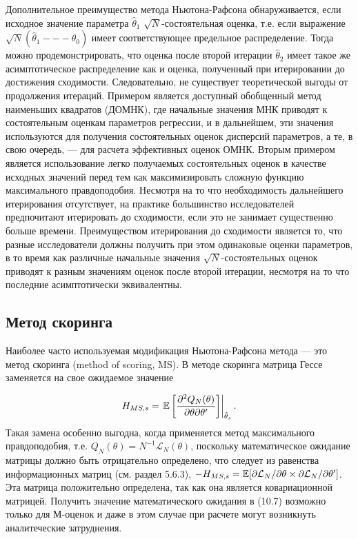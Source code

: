 Дополнительное преимущество метода Ньютона-Рафсона обнаруживается, если исходное значение параметра $\hat{\theta}_1$ $\sqrt{N}$-состоятельная оценка, т.е. если выражение $\sqrt{N}(\hat{\theta}_1 --- \theta_0)$ имеет соответствующее предельное распределение. Тогда можно продемонстрировать, что оценка после второй итерации $\hat{\theta}_2$ имеет такое же асимптотическое распределение как и оценка, полученный при итерировании до достижения сходимости. Следовательно, не существует теоретической выгоды от продолжения итераций. Примером является  доступный обобщенный метод наименьших квадратов (ДОМНК), где начальные значения МНК приводят к состоятельным оценкам параметров регрессии, и в дальнейшем, эти значения используются для получения состоятельных оценок дисперсий параметров, а те, в свою очередь, --- для расчета эффективных оценок ОМНК. Вторым примером является использование легко получаемых состоятельных оценок в качестве исходных значений перед тем как максимизировать сложную функцию максимального правдоподобия. Несмотря на то что необходимость дальнейшего итерирования отсутствует, на практике большинство исследователей предпочитают итерировать до сходимости, если это не занимает существенно больше времени. Преимуществом итерирования до сходимости является то, что разные исследователи должны получить при этом одинаковые оценки параметров, в то время как различные начальные значения $\sqrt{N}$-состоятельных оценок приводят к разным значениям оценок после второй итерации, несмотря на то что последние асимптотически эквивалентны.

\subsection{Метод скоринга}

Наиболее часто используемая модификация Ньютона-Рафсона метода --- это метод скоринга (method of scoring, MS). В методе скоринга матрица Гессе заменяется на свое ожидаемое значение

\begin{equation}
H_{MS,s} =\left. \mathbb{E} \left[\dfrac{\partial^2 Q_N(\theta)}{\partial{\theta}\partial{\theta}'}\right] \right|_{\hat{\theta}_s}. 
\end{equation}
Такая замена особенно выгодна, когда применяется метод максимального правдоподобия, т.е. $Q_N(\theta) = N^{-1}\mathcal{L}_N(\theta)$, поскольку математическое ожидание  матрицы должно быть отрицательно определено, что следует из равенства информационных матриц (см. раздел 5.6.3), $-H_{MS,s} = \mathbb{E} [\partial{\mathcal{L}_N}/\partial{\theta} \times \partial{\mathcal{L}_N}/\partial{\theta}']$. %
Эта матрица положительно определена, так как она является ковариационной матрицей. Получить значение математического ожидания в (10.7) возможно только для М-оценок и даже в этом случае при расчете могут возникнуть аналитеческие затруднения.

